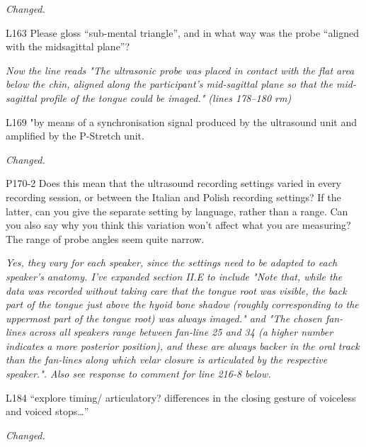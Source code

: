 \documentclass[]{article}
\begin{document}
\begin{adjustwidth}{1cm}{} \textit{
Changed.
} \end{adjustwidth}

L163 Please gloss ``sub-mental triangle'', and in what way was the probe
``aligned with the midsagittal plane''?

\begin{adjustwidth}{1cm}{} \textit{
Now the line reads "The ultrasonic probe was placed in contact with the flat area below the chin, aligned along the participant's mid-sagittal plane so that the mid-sagittal profile of the tongue could be imaged." (lines 178--180 rm)
} \end{adjustwidth}

L169 "by means of a synchronisation signal produced by the ultrasound
unit and amplified by the P-Stretch unit.

\begin{adjustwidth}{1cm}{} \textit{
Changed.
} \end{adjustwidth}

P170-2 Does this mean that the ultrasound recording settings varied in
every recording session, or between the Italian and Polish recording
settings? If the latter, can you give the separate setting by language,
rather than a range. Can you also say why you think this variation won't
affect what you are measuring? The range of probe angles seem quite
narrow.

\begin{adjustwidth}{1cm}{} \textit{
Yes, they vary for each speaker, since the settings need to be adapted to each speaker's anatomy. I've expanded section II.E to include "Note that, while the data was recorded without taking care that the tongue root was visible, the back part of the tongue just above the hyoid bone shadow (roughly corresponding to the uppermost part of the tongue root) was always imaged." and "The chosen fan-lines across all speakers range between fan-line 25 and 34 (a higher number indicates a more posterior position), and these are always backer in the oral track than the fan-lines along which velar closure is articulated by the respective speaker.". Also see response to comment for line 216-8 below.
} \end{adjustwidth}

L184 ``explore timing/ articulatory? differences in the closing gesture
of voiceless and voiced stops\ldots{}''

\begin{adjustwidth}{1cm}{} \textit{
Changed.
} \end{adjustwidth}
\end{document}
